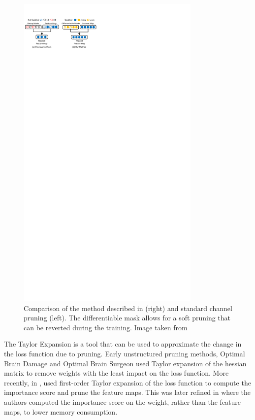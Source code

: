 \begin{figure}[htbp]
  \centering
  \includegraphics[width=0.8\textwidth,trim=0 0.4cm 0 0, clip]{chapter_sota/assets/operation_aware.pdf}
  \caption{Comparison of the method described in \cite{DBLP:conf/icml/KangH20}
    (right) and standard channel pruning (left). The differentiable mask allows
    for a soft pruning that can be reverted during the training. Image taken
    from \cite{DBLP:conf/icml/KangH20}}
  \label{fig:sota:operation_aware}
\end{figure}


The Taylor Expansion is a tool that can be used to approximate the change in the
loss function due to pruning. Early unstructured pruning methods, Optimal Brain
Damage \cite{DBLP:conf/nips/CunDS89} and Optimal Brain Surgeon
\cite{DBLP:conf/icnn/HassibiSW93} used Taylor expansion of the hessian matrix to
remove weights with the least impact on the loss function. More recently, in
\cite{DBLP:conf/iclr/MolchanovTKAK17},
\citeauthor{DBLP:conf/iclr/MolchanovTKAK17} used first-order Taylor expansion of
the loss function to compute the importance score and prune the feature maps.
This was later refined in \cite{DBLP:conf/cvpr/MolchanovMTFK19} where the
authors computed the importance score on the weight, rather than the feature
maps, to lower memory consumption.\\

